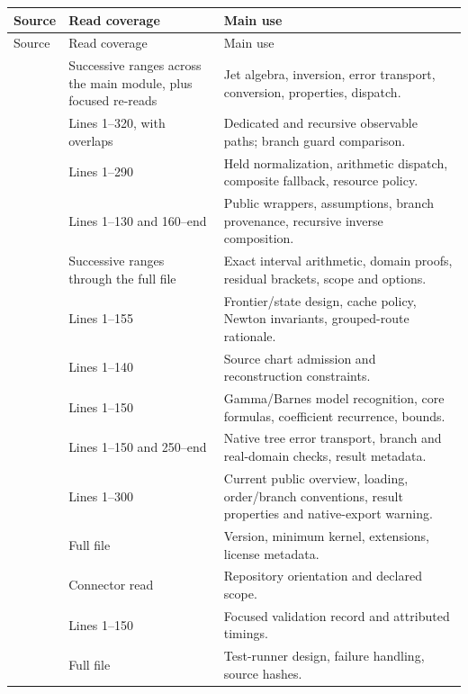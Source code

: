 \documentclass[11pt,a4paper]{article}
\theoremstyle{remark}\newtheorem{remark}[proposition]{Remark}
\begin{document}
\begin{longtable}{P{0.43\textwidth}P{0.2\textwidth}P{0.27\textwidth}}
\toprule Source & Read coverage & Main use \\\midrule
\endfirsthead
\toprule Source & Read coverage & Main use \\\midrule
\endhead
{} & Successive ranges across the main module, plus focused re-reads & Jet algebra, inversion, error transport, conversion, properties, dispatch. \\
 & Lines 1--320, with overlaps & Dedicated and recursive observable paths; branch guard comparison. \\
 & Lines 1--290 & Held normalization, arithmetic dispatch, composite fallback, resource policy. \\
 & Lines 1--130 and 160--end & Public wrappers, assumptions, branch provenance, recursive inverse composition. \\
 & Successive ranges through the full file & Exact interval arithmetic, domain proofs, residual brackets, scope and options. \\
 & Lines 1--155 & Frontier/state design, cache policy, Newton invariants, grouped-route rationale. \\
 & Lines 1--140 & Source chart admission and reconstruction constraints. \\
 & Lines 1--150 & Gamma/Barnes model recognition, core formulas, coefficient recurrence, bounds. \\
 & Lines 1--150 and 250--end & Native tree error transport, branch and real-domain checks, result metadata. \\
 & Lines 1--300 & Current public overview, loading, order/branch conventions, result properties and native-export warning. \\
 & Full file & Version, minimum kernel, extensions, license metadata. \\
 & Connector read & Repository orientation and declared scope. \\
 & Lines 1--150 & Focused validation record and attributed timings. \\
 & Full file & Test-runner design, failure handling, source hashes. \\

\end{longtable}
\end{document}

